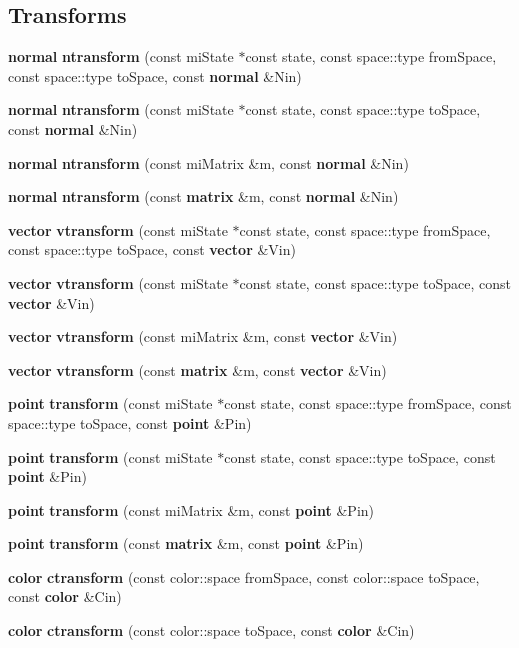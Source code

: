 \subsection*{Transforms}
\begin{CompactItemize}
\item 
{\bf normal} {\bf ntransform} (const mi\-State $\ast$const state, const space::type from\-Space, const space::type to\-Space, const {\bf normal} \&Nin)
\item 
{\bf normal} {\bf ntransform} (const mi\-State $\ast$const state, const space::type to\-Space, const {\bf normal} \&Nin)
\item 
{\bf normal} {\bf ntransform} (const mi\-Matrix \&m, const {\bf normal} \&Nin)
\item 
{\bf normal} {\bf ntransform} (const {\bf matrix} \&m, const {\bf normal} \&Nin)
\item 
{\bf vector} {\bf vtransform} (const mi\-State $\ast$const state, const space::type from\-Space, const space::type to\-Space, const {\bf vector} \&Vin)
\item 
{\bf vector} {\bf vtransform} (const mi\-State $\ast$const state, const space::type to\-Space, const {\bf vector} \&Vin)
\item 
{\bf vector} {\bf vtransform} (const mi\-Matrix \&m, const {\bf vector} \&Vin)
\item 
{\bf vector} {\bf vtransform} (const {\bf matrix} \&m, const {\bf vector} \&Vin)
\item 
{\bf point} {\bf transform} (const mi\-State $\ast$const state, const space::type from\-Space, const space::type to\-Space, const {\bf point} \&Pin)
\item 
{\bf point} {\bf transform} (const mi\-State $\ast$const state, const space::type to\-Space, const {\bf point} \&Pin)
\item 
{\bf point} {\bf transform} (const mi\-Matrix \&m, const {\bf point} \&Pin)
\item 
{\bf point} {\bf transform} (const {\bf matrix} \&m, const {\bf point} \&Pin)
\item 
{\bf color} {\bf ctransform} (const color::space from\-Space, const color::space to\-Space, const {\bf color} \&Cin)
\item 
{\bf color} {\bf ctransform} (const color::space to\-Space, const {\bf color} \&Cin)
\end{CompactItemize}

